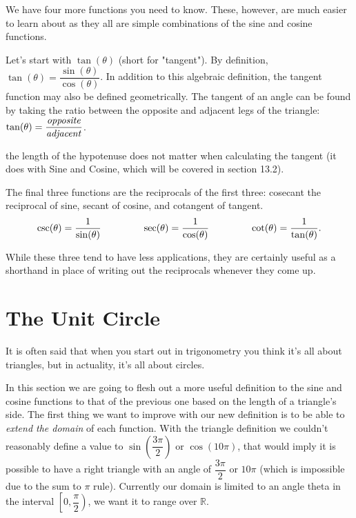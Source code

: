 \documentclass[lang=en,11pt]{elegantbook}
\begin{document}
We have four more functions you need to know. These, however, are much easier to learn about as they all are simple combinations of the sine and cosine functions.

Let’s start with $\tan(\theta)$ (short for "tangent"). By definition, $\tan(\theta)=\dfrac{\sin(\theta)}{\cos(\theta)}$. In addition to this algebraic definition, the tangent function may also be defined geometrically. The tangent of an angle can be found by taking the ratio between the opposite and adjacent legs of the triangle: $\tan(\theta)=\dfrac{\text{\textit{opposite}}}{\text{\textit{adjacent}}}$.

\begin{remark}
the length of the hypotenuse does not matter when calculating the tangent (it does with Sine and Cosine, which will be covered in section 13.2).
\end{remark}

The final three functions are the reciprocals of the first three: cosecant the reciprocal of sine, secant of cosine, and cotangent of tangent. $$\csc(\theta)=\dfrac{1}{\sin(\theta)} \hspace{15mm} \sec(\theta)=\dfrac{1}{\cos(\theta)}\hspace{15mm} \cot(\theta)=\dfrac{1}{\tan(\theta)}.$$

While these three tend to have less applications, they are certainly useful as a shorthand in place of writing out the reciprocals whenever they come up.

\section{The Unit Circle}
\begin{wrapfigure}{r}{4cm}
\end{wrapfigure}
\noindent It is often said that when you start out in trigonometry you think it’s all about triangles, but in actuality, it’s all about circles.

In this section we are going to flesh out a more useful definition to the sine and cosine functions to that of the previous one based on the length of a triangle’s side. The first thing we want to improve with our new definition is to be able to \textit{extend the domain} of each function. With the triangle definition we couldn't reasonably define a value to $\sin\left(\dfrac{3\pi}{2}\right)$ or $\cos(10\pi)$, that would imply it is possible to have a right triangle with an angle of $\dfrac{3\pi}{2}$ or $10\pi$ (which is impossible due to the sum to $\pi$ rule). Currently our domain is limited to an angle theta in the interval $\left[0,\dfrac{\pi}{2}\right)$, we want it to range over $\mathbb{R}$.
\end{document}
